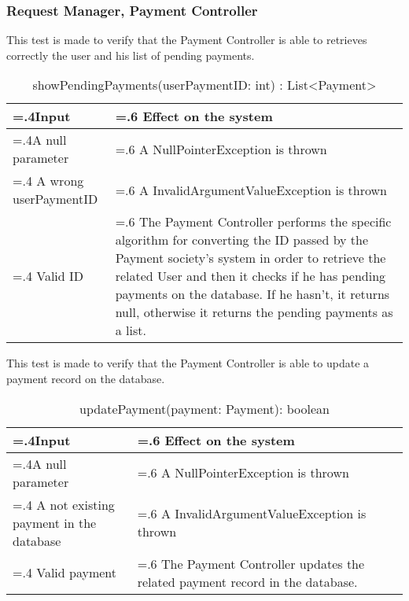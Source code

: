 \documentclass[10pt, a4paper,titlepage]{article}
\begin{document}
\subsubsection{Request Manager, Payment Controller}
This test is made to verify that the Payment Controller is able to retrieves correctly the user and his list of pending payments.
\begin{table}[h]
\caption{showPendingPayments(userPaymentID: int) : List<Payment>}
\begin{tabularx}{\textwidth}{|>{\hsize=.4\hsize}X|>{\hsize=.6\hsize}X|}
\hline
Input & Effect on the system\\
\hline
A null parameter & A NullPointerException is thrown\\
\hline
A wrong userPaymentID & A InvalidArgumentValueException is thrown\\
\hline
Valid ID & The Payment Controller performs the specific algorithm for converting the ID passed by the Payment society’s system in order to retrieve the related User and then it checks if he has pending payments on the database. If he hasn’t, it returns null, otherwise it returns the pending payments as a list.\\
\hline
\end{tabularx}
\end{table}
\linebreak
This test is made to verify that the Payment Controller is able to update a payment record on the database.
\begin{table}[h]
\caption{updatePayment(payment: Payment): boolean}
\begin{tabularx}{\textwidth}{|>{\hsize=.4\hsize}X|>{\hsize=.6\hsize}X|}
\hline
Input & Effect on the system\\
\hline
A null parameter & A NullPointerException is thrown\\
\hline
A not existing payment in the database & A InvalidArgumentValueException is thrown\\
\hline
Valid payment & The Payment Controller updates the related payment record in the database.\\
\hline
\end{tabularx}
\end{table}
\linebreak
\end{document}
